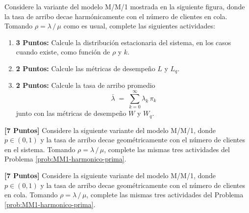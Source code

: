 \documentclass[ a4paper, twoside, 11pt]{article}
\begin{document}
\begin{problem}
\label{prob:MM1-harmonico-prima}
Considere la variante del modelo M/M/1 mostrada en la siguiente figura, donde la tasa de arribo decae harm\'onicamente con el n\'umero de clientes en cola. Tomando $\rho = \lambda \, / \, \mu$ como es usual, complete las siguientes actividades: 

\begin{figure}[htb]
\centering
\def\svgwidth{0.9\columnwidth}

\end{figure}
\halfskip

\begin{enumerate}[label=\textbf{\alph*)}]
\item \textbf{3 Puntos:} Calcule la distribuci\'on estacionaria del sistema, en los casos cuando existe, como funci\'on de $\rho$ y $k$. 
\item \textbf{2 Puntos:} Calcule las m\'etricas de desempe\~no $L$ y $L_q$. 
\item \textbf{2 Puntos:} Calcule la tasa de arribo promedio
\[
\bar{\lambda} \; = \; \sum_{k=0}^{\infty} \lambda_{k} \, \pi_k
\]
junto con las m\'etricas de desempe\~no $W$ y $W_q$. 
\end{enumerate}

\end{problem}
\vspace{\baselineskip}

\begin{problem}
\textbf{[7 Puntos]} Considere la siguiente variante del modelo M/M/1, donde $p \in (0,1)$ y la tasa de arribo decae geom\'etricamente con el n\'umero de clientes en el sistema. Tomando $\rho = \lambda \, / \, \mu$, complete las mismas tres actividades del Problema \ref{prob:MM1-harmonico-prima}. 

\begin{figure}[htb]
\centering
\def\svgwidth{0.9\columnwidth}

\end{figure}
\halfskip

\end{problem}
\vspace{\baselineskip}

\begin{problem}
\textbf{[7 Puntos]} Considere la siguiente variante del modelo M/M/1, donde $p \in (0,1)$ y la tasa de arribo decae geom\'etricamente con el n\'umero de clientes en cola. Tomando $\rho = \lambda \, / \, \mu$, complete las mismas tres actividades del Problema \ref{prob:MM1-harmonico-prima}. 

\begin{figure}[htb]
\centering
\def\svgwidth{0.9\columnwidth}

\end{figure}
\halfskip

\end{problem}
\vspace{\baselineskip}
\end{document}
